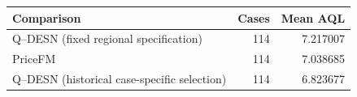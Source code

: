 \begingroup
\TableStyle
\begin{tabular}{@{}lrr@{}}
\toprule
Comparison & Cases & Mean AQL \\
\midrule
Q--DESN (fixed regional specification) & 114 & 7.217007 \\
PriceFM & 114 & 7.038685 \\
Q--DESN (historical case-specific selection) & 114 & 6.823677 \\
\bottomrule
\end{tabular}
\endgroup
